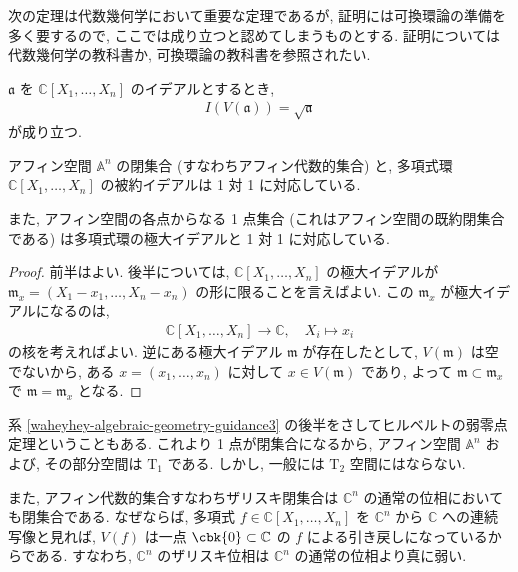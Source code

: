 \documentclass[openany, a4paper, oneside]{jsbook}
\begin{document}
次の定理は代数幾何学において重要な定理であるが,
証明には可換環論の準備を多く要するので, ここでは成り立つと認めてしまうものとする.
証明については代数幾何学の教科書か, 可換環論の教科書を参照されたい.
\begin{thm}[ヒルベルトの零点定理]
 $\mathfrak{a}$ を $\mathbb{C}[X_1, \dots, X_n]$ のイデアルとするとき,
 \begin{align}
  I (V ( \mathfrak{a} ) )
  =
  \sqrt{ \mathfrak{a} }
 \end{align}
が成り立つ. \fin
\end{thm}
\begin{cor}\label{waheyhey-algebraic-geometry-guidance3}
 アフィン空間 $\mathbb{A}^n$ の閉集合 (すなわちアフィン代数的集合) と,
 多項式環 $\mathbb{C}[X_1, \dots, X_n]$ の被約イデアルは 1 対 1 に対応している.

また, アフィン空間の各点からなる 1 点集合 (これはアフィン空間の既約閉集合である) は多項式環の極大イデアルと 1 対 1 に対応している. \fin
\end{cor}
\begin{proof}
前半はよい.
後半については, $\mathbb{C}[X_1, \dots, X_n]$ の極大イデアルが
$\mathfrak{m}_x = (X_1 - x_1, \dots, X_n - x_n)$ の形に限ることを言えばよい.
この $\mathfrak{m}_x$ が極大イデアルになるのは,
\begin{align}
 \mathbb{C}[X_1, \dots, X_n]
 \longrightarrow
 \mathbb{C}, \quad X_i \mapsto x_i
\end{align}
の核を考えればよい.
逆にある極大イデアル $\mathfrak{m}$ が存在したとして, $V ( \mathfrak{m} )$ は空でないから,
ある $x = (x_1, \dots, x_n)$ に対して $x \in V ( \mathfrak{m} )$ であり,
よって $ \mathfrak{m} \subset \mathfrak{m}_x$ で $ \mathfrak{m} = \mathfrak{m}_x$ となる.
\end{proof}

\begin{rem}
系 \ref{waheyhey-algebraic-geometry-guidance3} の後半をさしてヒルベルトの弱零点定理ということもある.
これより 1 点が閉集合になるから, アフィン空間 $\mathbb{A}^n$ および, その部分空間は $\mathrm{T}_1$ である.
しかし, 一般には $\mathrm{T}_2$ 空間にはならない.

また, アフィン代数的集合すなわちザリスキ閉集合は $\mathbb{C}^n$ の通常の位相においても閉集合である.
なぜならば, 多項式 $f \in \mathbb{C}[X_1, \dots, X_n]$ を $\mathbb{C}^n$ から $\mathbb{C}$ への連続写像と見れば,
$V ( f )$ は一点 $\cbk{0} \subset \mathbb{C}$ の $f$ による引き戻しになっているからである.
すなわち,  $\mathbb{C}^n$ のザリスキ位相は $\mathbb{C}^n$ の通常の位相より真に弱い. \fin
\end{rem}
\end{document}
